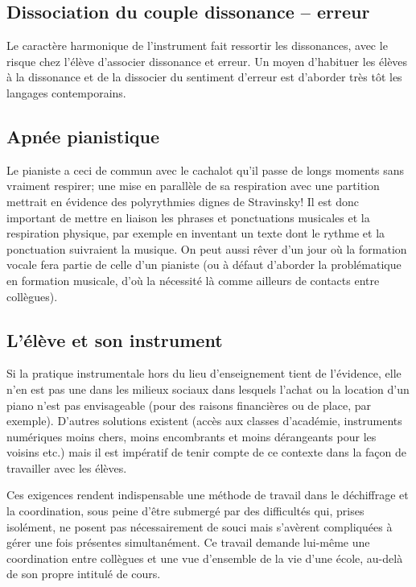 \subsection*{Dissociation du couple dissonance -- erreur}
Le caractère harmonique de l'instrument fait ressortir les dissonances, avec le risque chez l'élève d'associer dissonance et erreur. Un moyen d'habituer les élèves à la dissonance et de la dissocier du sentiment d'erreur est d'aborder très tôt les langages contemporains.

\subsection*{Apnée pianistique}
Le pianiste a ceci de commun avec le cachalot qu'il passe de longs moments sans vraiment respirer; une mise en parallèle de sa respiration avec une partition mettrait en évidence des polyrythmies dignes de Stravinsky! Il est donc important de mettre en liaison les phrases et ponctuations musicales et la respiration physique, par exemple en inventant un texte dont le rythme et la ponctuation suivraient la musique. On peut aussi rêver d'un jour où la formation vocale fera partie de celle d'un pianiste (ou à défaut d'aborder la problématique en formation musicale, d'où la nécessité là comme ailleurs de contacts entre collègues).

\subsection*{L'élève et son instrument}
Si la pratique instrumentale hors du lieu d'enseignement tient de l'évidence, elle n'en est pas une dans les milieux sociaux dans lesquels l'achat ou la location d'un piano n'est pas envisageable (pour des raisons financières ou de place, par exemple). D'autres solutions existent (accès aux classes d'académie, instruments numériques moins chers, moins encombrants et moins dérangeants pour les voisins etc.) mais il est impératif de tenir compte de ce contexte dans la façon de travailler avec les élèves.

Ces exigences rendent indispensable une méthode de travail dans le déchiffrage et la coordination, sous peine d'être submergé par des difficultés qui, prises isolément, ne posent pas nécessairement de souci mais s'avèrent compliquées à gérer une fois présentes simultanément. Ce travail demande lui-même une coordination entre collègues et une vue d'ensemble de la vie d'une école, au-delà de son propre intitulé de cours.




